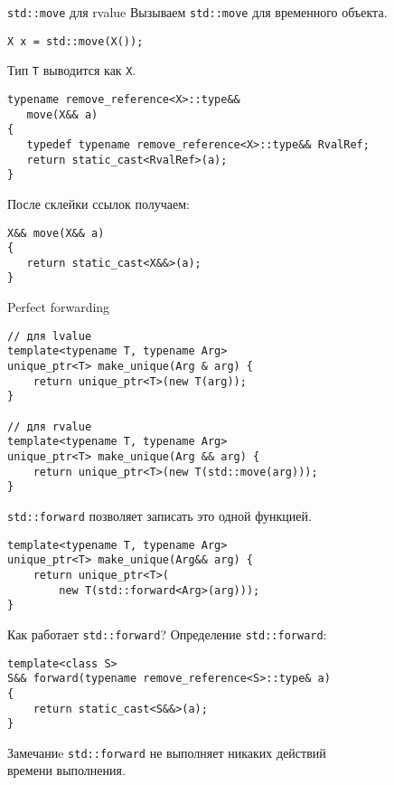 \documentclass[aspectration=1610,t]{beamer}
\begin{document}
\begin{frame}[fragile]{{\tt std::move} для rvalue}
Вызываем \texttt{std::move} для временного объекта.
\begin{lstlisting}
X x = std::move(X());
\end{lstlisting}
Тип \texttt{T} выводится как \texttt{X}.
    \begin{lstlisting}
typename remove_reference<X>::type&&
   move(X&& a) 
{
   typedef typename remove_reference<X>::type&& RvalRef;
   return static_cast<RvalRef>(a);
} 
    \end{lstlisting}
После склейки ссылок получаем:
    \begin{lstlisting}
X&& move(X&& a) 
{
   return static_cast<X&&>(a);
} 
    \end{lstlisting}

\end{frame}


\begin{frame}[fragile]{Perfect forwarding}
    \begin{lstlisting}
// для lvalue
template<typename T, typename Arg> 
unique_ptr<T> make_unique(Arg & arg) { 
    return unique_ptr<T>(new T(arg));
} 

// для rvalue
template<typename T, typename Arg> 
unique_ptr<T> make_unique(Arg && arg) { 
    return unique_ptr<T>(new T(std::move(arg)));
} 
    \end{lstlisting}

\texttt{std::forward} позволяет записать это одной функцией.
    \begin{lstlisting}
template<typename T, typename Arg> 
unique_ptr<T> make_unique(Arg&& arg) { 
    return unique_ptr<T>(
        new T(std::forward<Arg>(arg)));
} 
    \end{lstlisting}
\end{frame}

\begin{frame}[fragile]{Как работает \texttt{std::forward}?}
Определение \texttt{std::forward}:
    \begin{lstlisting}
template<class S>
S&& forward(typename remove_reference<S>::type& a) 
{
    return static_cast<S&&>(a);
} 
    \end{lstlisting}

\begin{block}{Замечаниe}
    \texttt{std::forward} не выполняет никаких действий\\
    времени выполнения.
\end{block}
\end{frame}
\end{document}
